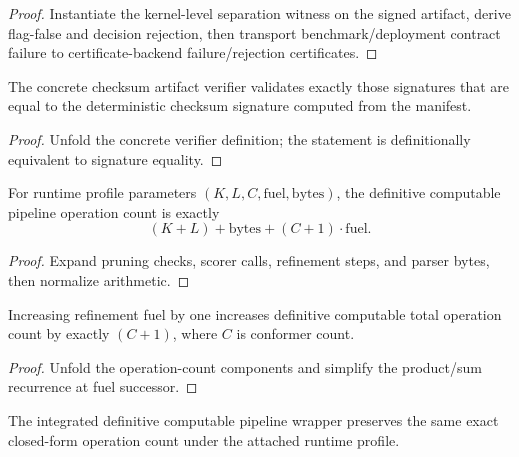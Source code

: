 \begin{proof}
Instantiate the kernel-level separation witness on the signed artifact, derive flag-false and decision rejection, then transport benchmark/deployment contract failure to certificate-backend failure/rejection certificates.
\end{proof}

\begin{theorem}
\label{thm:definitive-concrete-checksum-verifier-exactness}
The concrete checksum artifact verifier validates exactly those signatures that are equal to the deterministic checksum signature computed from the manifest.
\end{theorem}

\begin{proof}
Unfold the concrete verifier definition; the statement is definitionally equivalent to signature equality.
\end{proof}

\begin{theorem}
\label{thm:definitive-runtime-ops-closed-form}
For runtime profile parameters $(K,L,C,\mathrm{fuel},\mathrm{bytes})$, the definitive computable pipeline operation count is exactly
\[
(K+L) + \mathrm{bytes} + (C+1)\cdot \mathrm{fuel}.
\]
\end{theorem}

\begin{proof}
Expand pruning checks, scorer calls, refinement steps, and parser bytes, then normalize arithmetic.
\end{proof}

\begin{theorem}
\label{thm:definitive-runtime-ops-succ-recurrence}
Increasing refinement fuel by one increases definitive computable total operation count by exactly $(C+1)$, where $C$ is conformer count.
\end{theorem}

\begin{proof}
Unfold the operation-count components and simplify the product/sum recurrence at fuel successor.
\end{proof}

\begin{theorem}
\label{thm:definitive-pipeline-total-ops-closed-form}
The integrated definitive computable pipeline wrapper preserves the same exact closed-form operation count under the attached runtime profile.
\end{theorem}


